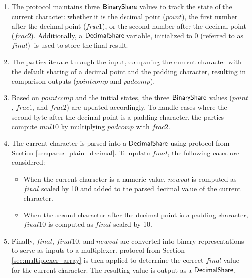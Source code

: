 \begin{enumerate} 
    \item The protocol maintains three ${\mathsf{BinaryShare}}$ values to track the state of the current character: whether it is the decimal point ($point$), the first number after the decimal point ($frac1$), or the second number after the decimal point ($frac2$). Additionally, a ${\mathsf{DecimalShare}}$ variable, initialized to $0$ (referred to as $final$), is used to store the final result. 
    \item The parties iterate through the input, comparing the current character with the default sharing of a decimal point and the padding character, resulting in comparison outputs ($pointcomp$ and $padcomp$).
    \item Based on $pointcomp$ and the initial states, the three ${\mathsf{BinaryShare}}$ values ($point$, $frac1$, and $frac2$) are updated accordingly. To handle cases where the second byte after the decimal point is a padding character, the parties compute $mul10$ by multiplying $padcomp$ with $frac2$. 
    \item The current character is parsed into a ${\mathsf{DecimalShare}}$ using protocol from Section \ref{sec:parse_plain_decimal}. To update $final$, the following cases are considered: 
    \begin{itemize} 
        \item When the current character is a numeric value, $newval$ is computed as $final$ scaled by 10 and added to the parsed decimal value of the current character. 
        \item When the second character after the decimal point is a padding character, $final10$ is computed as $final$ scaled by 10. 
    \end{itemize} 
    \item Finally, $final$, $final10$, and $newval$ are converted into binary representations to serve as inputs to a multiplexer. protocol from Section \ref{sec:multiplexer_array} is then applied to determine the correct $final$ value for the current character. The resulting value is output as a ${\mathsf{DecimalShare}}$. 
\end{enumerate}

